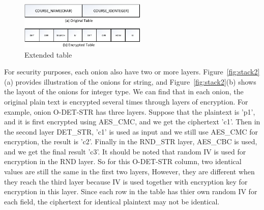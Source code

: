 

\begin{figure}[tb]
\centering
\includegraphics[width=6cm]{images/extend.pdf}
\caption{Extended table}
\label{fig:stackx}
\end{figure}

For security purposes, each onion also have two or more layers. Figure~\ref{fig:stack2}(a) provides illustration of the onions for string, and Figure~\ref{fig:stack2}(b) shows the layout of the onions for integer type. We can find that in each onion, the original plain text is encrypted several times through layers of encryption. For example, onion O-DET-STR has three layers. Suppose that the plaintext is 'p1', and it is first encrypted using AES\_CMC, and we get the ciphertext 'c1'. Then in the second layer DET\_STR, 'c1' is used as input and we still use AES\_CMC for encryption, the result is 'c2'. Finally in the RND\_STR layer, AES\_CBC is used, and we get the final result 'c3'. It should be noted that random IV is used for encryption in the RND layer. So for this O-DET-STR column, two identical values are still the same in the first two layers, However, they are different when they reach the third layer because IV is used together with encryption key for encryption in this layer. Since each row in the table has thier own random IV for each field, the ciphertext for identical plaintext may not be identical. 

